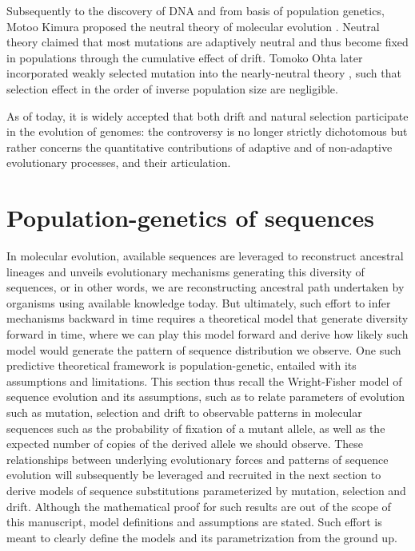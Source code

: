 Subsequently to the discovery of \acrshort{DNA} and from basis of population genetics, Motoo Kimura proposed the \gls{neutral} theory of molecular evolution \citep{kimura1968evolutionary,kimura1991neutral,kimura1986dna}.
Neutral theory claimed that most mutations are adaptively \gls{neutral} and thus become fixed in populations through the cumulative effect of \gls{drift}.
Tomoko Ohta later incorporated weakly selected mutation into the \gls{nearly-neutral} theory \citep{ohta1973slightly}, such that selection effect in the order of inverse population size are negligible.

As of today, it is widely accepted that both \gls{drift} and natural selection participate in the evolution of genomes: the controversy is no longer strictly dichotomous but rather concerns the quantitative contributions of adaptive and of non-adaptive evolutionary processes, and their articulation.

\section{Population-genetics of sequences}
In molecular evolution, available sequences are leveraged to reconstruct ancestral lineages and unveils evolutionary mechanisms generating this diversity of sequences, or in other words, we are reconstructing ancestral path undertaken by organisms using available knowledge today.
But ultimately, such effort to infer mechanisms backward in time requires a theoretical model that generate diversity forward in time, where we can play this model forward and derive how likely such model would generate the pattern of sequence distribution we observe.
One such predictive theoretical framework is population-genetic, entailed with its assumptions and limitations.
This section thus recall the Wright-Fisher model of sequence evolution and its assumptions, such as to relate parameters of evolution such as mutation, selection and drift to observable patterns in molecular sequences such as the probability of fixation of a mutant \gls{allele}, as well as the expected number of copies of the derived \gls{allele} we should observe.
These relationships between underlying evolutionary forces and patterns of sequence evolution will subsequently be leveraged and recruited in the next section to derive models of sequence substitutions parameterized by mutation, selection and drift.
Although the mathematical proof for such results are out of the scope of this manuscript, model definitions and assumptions are stated. 
Such effort is meant to clearly define the models and its parametrization from the ground up. 

